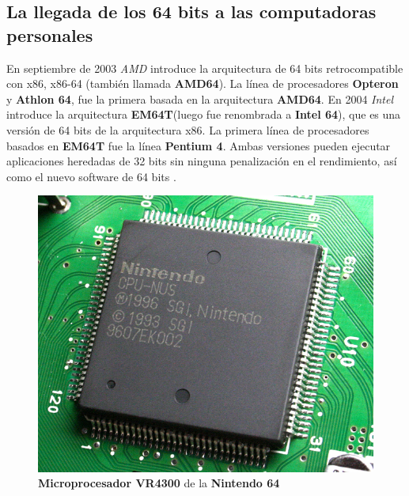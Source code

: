 \subsection{La llegada de los 64 bits a las computadoras personales}
En septiembre de 2003 \emph{AMD} introduce la arquitectura de 64 bits retrocompatible con x86, x86-64 (también llamada \textbf{AMD64}). La línea
de procesadores \textbf{Opteron} y \textbf{Athlon 64}, fue la primera basada en la arquitectura \textbf{AMD64}. En 2004 \emph{Intel} introduce la
arquitectura \textbf{EM64T}(luego fue renombrada a \textbf{Intel 64}), que es una versión de 64 bits de la arquitectura x86. La primera línea
de procesadores basados en \textbf{EM64T} fue la línea \textbf{Pentium 4}. Ambas versiones pueden ejecutar aplicaciones heredadas de 32 bits sin ninguna
penalización en el rendimiento, así como el nuevo software de 64 bits .

\begin{figure}[htb]
	\centering
	\includegraphics[scale = 0.15]{Graphics/CPU-NUS_01-Nintendo64.jpg}
	\caption{\textbf{Microprocesador VR4300} de la \textbf{Nintendo 64}}
	\label{fig:19}
\end{figure}

